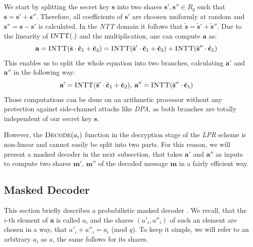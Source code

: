 We start by splitting the secret key \(\textbf{s}\) into two shares \(\textbf{s}',\textbf{s}'' \in R_q\) such that \(\textbf{s}=\textbf{s}'+\textbf{s}''\). Therefore, all coefficients of \(\textbf{s}'\) are choosen uniformly at random and \(\textbf{s}''=\textbf{s}-\textbf{s}'\) is calculated. In the \textit{\ac{NTT}} domain it follows that \(\tilde{\textbf{s}}=\tilde{\textbf{s}}'+\tilde{\textbf{s}}''\). Due to the linearity of \(\textsc{INTT}(.)\) and the multiplication, one can compute \(\textbf{a}\) as:
\begin{equation}
	\textbf{a}=\textsc{INTT}(\tilde{\textbf{s}} \cdot \tilde{\textbf{c}}_1+\tilde{\textbf{c}}_2)=\textsc{INTT}(\tilde{\textbf{s}}' \cdot \tilde{\textbf{c}}_1+\tilde{\textbf{c}}_2)+\textsc{INTT}(\tilde{\textbf{s}}'' \cdot \tilde{\textbf{c}}_1)
\end{equation}
This enables us to split the whole equation into two branches, calculating \(\textbf{a}'\) and \(\textbf{a}''\) in the following way:
\begin{equation}
	\textbf{a}'=\textsc{INTT}(\tilde{\textbf{s}}' \cdot \tilde{\textbf{c}}_1+\tilde{\textbf{c}}_2),\:\textbf{a}''=\textsc{INTT}(\tilde{\textbf{s}}'' \cdot \tilde{\textbf{c}}_1)
\end{equation}
Those computations can be done on an arithmetic processor without any protection against side-channel attacks like \textit{\ac{DPA}}, as both branches are totally independent of our secret key \(\textbf{s}\).

However, the \(\textsc{Decode}(a_{i})\) function in the decryption stage of the \textit{\ac{LPR}} scheme is non-linear and cannot easily be split into two parts. For this reason, we will present a masked decoder in the next subsection, that takes \(\textbf{a}'\) and \(\textbf{a}''\) as inputs to compute two shares \(\textbf{m}'\), \(\textbf{m}''\) of the decoded message \(\textbf{m}\) in a fairly efficient way.

\subsection{Masked Decoder}
This section briefly describes a probabilistic masked decoder \cite{maskedRing}. We recall, that the \(i\)-th element of \(\textbf{a}\) is called \(a_i\) and the shares \((a'_i,a''_i)\) of such an element are chosen in a way, that \(a'_i + a''_i = a_i\) (mod \(q\)). To keep it simple, we will refer to an arbitrary \(a_i\) as \(a\), the same follows for its shares.

